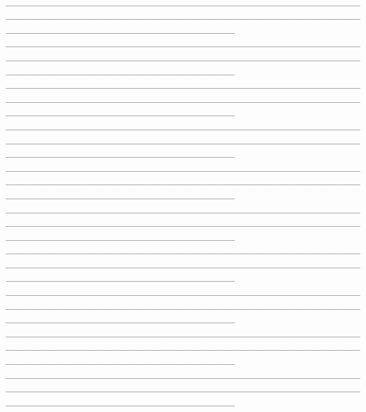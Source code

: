 \documentclass[12pt]{article}
\begin{document}
\\\_\_\_\_\_\_\_\_\_\_\_\_\_\_\_\_\_\_\_\_\_\_\_\_\_\_\_\_\_\_\_\_\_\_\_\_\_\_\_\_\_\_\_\_\_\_\_\_\_\_\_\_\_\_\_\_\_\_\_\_\_\_\_\_\_\_\_\_\_\_\_\_\_\_\_\_\_\_\_\_\_\_\_\_\_\_\_\_\_\_\_\_\_\_\_\_\_\_\_\_\_\_\_\_\_\_\_\_\_\_\_\_\_\_\_\_\_\_\_\_\_\_\_\_\_\_\_
\\\_\_\_\_\_\_\_\_\_\_\_\_\_\_\_\_\_\_\_\_\_\_\_\_\_\_\_\_\_\_\_\_\_\_\_\_\_\_\_\_\_\_\_\_\_\_\_\_\_\_\_\_\_\_\_\_\_\_\_\_\_\_\_\_\_\_\_\_\_\_\_\_\_\_\_\_\_\_\_\_\_\_\_\_\_\_\_\_\_\_\_\_\_\_\_\_\_\_\_\_\_\_\_\_\_\_\_\_\_\_\_\_\_\_\_\_\_\_\_\_\_\_\_\_\_\_\_
\\\_\_\_\_\_\_\_\_\_\_\_\_\_\_\_\_\_\_\_\_\_\_\_\_\_\_\_\_\_\_\_\_\_\_\_\_\_\_\_\_\_\_\_\_\_\_\_\_\_\_\_\_\_\_\_\_\_\_\_\_\_\_\_\_\_\_\_\_\_\_\_\_\_\_\_\_\_\_\_\_\_\_\_\_\_\_\_\_\_\_\_\_\_\_\_\_\_\_\_\_\_\_\_\_\_\_\_\_\_\_\_\_\_\_\_\_\_\_\_\_\_\_\_\_\_\_\_
\\\_\_\_\_\_\_\_\_\_\_\_\_\_\_\_\_\_\_\_\_\_\_\_\_\_\_\_\_\_\_\_\_\_\_\_\_\_\_\_\_\_\_\_\_\_\_\_\_\_\_\_\_\_\_\_\_\_\_\_\_\_\_\_\_\_\_\_\_\_\_\_\_\_\_\_\_\_\_\_\_\_\_\_\_\_\_\_\_\_\_\_\_\_\_\_\_\_\_\_\_\_\_\_\_\_\_\_\_\_\_\_\_\_\_\_\_\_\_\_\_\_\_\_\_\_\_\_
\\\_\_\_\_\_\_\_\_\_\_\_\_\_\_\_\_\_\_\_\_\_\_\_\_\_\_\_\_\_\_\_\_\_\_\_\_\_\_\_\_\_\_\_\_\_\_\_\_\_\_\_\_\_\_\_\_\_\_\_\_\_\_\_\_\_\_\_\_\_\_\_\_\_\_\_\_\_\_\_\_\_\_\_\_\_\_\_\_\_\_\_\_\_\_\_\_\_\_\_\_\_\_\_\_\_\_\_\_\_\_\_\_\_\_\_\_\_\_\_\_\_\_\_\_\_\_\_
\\\_\_\_\_\_\_\_\_\_\_\_\_\_\_\_\_\_\_\_\_\_\_\_\_\_\_\_\_\_\_\_\_\_\_\_\_\_\_\_\_\_\_\_\_\_\_\_\_\_\_\_\_\_\_\_\_\_\_\_\_\_\_\_\_\_\_\_\_\_\_\_\_\_\_\_\_\_\_\_\_\_\_\_\_\_\_\_\_\_\_\_\_\_\_\_\_\_\_\_\_\_\_\_\_\_\_\_\_\_\_\_\_\_\_\_\_\_\_\_\_\_\_\_\_\_\_\_
\\\_\_\_\_\_\_\_\_\_\_\_\_\_\_\_\_\_\_\_\_\_\_\_\_\_\_\_\_\_\_\_\_\_\_\_\_\_\_\_\_\_\_\_\_\_\_\_\_\_\_\_\_\_\_\_\_\_\_\_\_\_\_\_\_\_\_\_\_\_\_\_\_\_\_\_\_\_\_\_\_\_\_\_\_\_\_\_\_\_\_\_\_\_\_\_\_\_\_\_\_\_\_\_\_\_\_\_\_\_\_\_\_\_\_\_\_\_\_\_\_\_\_\_\_\_\_\_\\
\_\_\_\_\_\_\_\_\_\_\_\_\_\_\_\_\_\_\_\_\_\_\_\_\_\_\_\_\_\_\_\_\_\_\_\_\_\_\_\_\_\_\_\_\_\_\_\_\_\_\_\_\_\_\_\_\_\_\_\_\_\_\_\_\_\_\_\_\_\_\_\_\_\_\_\_\_\_\_\_\_\_\_\_\_\_\_\_\_\_\_\_\_\_\_\_\_\_\_\_\_\_\_\_\_\_\_\_\_\_\_\_\_\_\_\_\_\_\_\_\_\_\_\_\_\_\_\\
\_\_\_\_\_\_\_\_\_\_\_\_\_\_\_\_\_\_\_\_\_\_\_\_\_\_\_\_\_\_\_\_\_\_\_\_\_\_\_\_\_\_\_\_\_\_\_\_\_\_\_\_\_\_\_\_\_\_\_\_\_\_\_\_\_\_\_\_\_\_\_\_\_\_\_\_\_\_\_\_\_\_\_\_\_\_\_\_\_\_\_\_\_\_\_\_\_\_\_\_\_\_\_\_\_\_\_\_\_\_\_\_\_\_\_\_\_\_\_\_\_\_\_\_\_\_\_\\
\_\_\_\_\_\_\_\_\_\_\_\_\_\_\_\_\_\_\_\_\_\_\_\_\_\_\_\_\_\_\_\_\_\_\_\_\_\_\_\_\_\_\_\_\_\_\_\_\_\_\_\_\_\_\_\_\_\_\_\_\_\_\_\_\_\_\_\_\_\_\_\_\_\_\_\_\_\_\_\_\_\_\_\_\_\_\_\_\_\_\_\_\_\_\_\_\_\_\_\_\_\_\_\_\_\_\_\_\_\_\_\_\_\_\_\_\_\_\_\_\_\_\_\_\_\_\_\\
\end{document}

